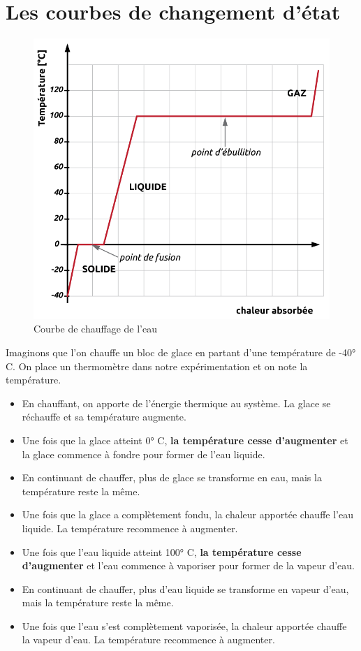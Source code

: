 \documentclass[
  11pt,
  french,
  a4paper,
  openany]{book}
\providecommand{\tightlist}{%
  \setlength{\itemsep}{0pt}\setlength{\parskip}{0pt}}
\begin{document}
\hypertarget{les-courbes-de-changement-duxe9tat}{%
\section{Les courbes de changement d'état}\label{les-courbes-de-changement-duxe9tat}}

\begin{figure}

{\centering \includegraphics[width=0.4\linewidth]{images/courbe-chgt-etat} 

}

\caption{Courbe de chauffage de l'eau}\label{fig:courbe-chgt-etat}
\end{figure}

Imaginons que l'on chauffe un bloc de glace en partant d'une température de -40° C. On place un thermomètre dans notre expérimentation et on note la température.

\begin{itemize}
\tightlist
\item
  En chauffant, on apporte de l'énergie thermique au système. La glace se réchauffe et sa température augmente.
\item
  Une fois que la glace atteint 0° C, \textbf{la température cesse d'augmenter} et la glace commence à fondre pour former de l'eau liquide.
\item
  En continuant de chauffer, plus de glace se transforme en eau, mais la température reste la même.
\item
  Une fois que la glace a complètement fondu, la chaleur apportée chauffe l'eau liquide.
  La température recommence à augmenter.
\item
  Une fois que l'eau liquide atteint 100° C, \textbf{la température cesse d'augmenter} et l'eau commence à vaporiser pour former de la vapeur d'eau.
\item
  En continuant de chauffer, plus d'eau liquide se transforme en vapeur d'eau, mais la température reste la même.
\item
  Une fois que l'eau s'est complètement vaporisée, la chaleur apportée chauffe la vapeur d'eau.
  La température recommence à augmenter.
\end{itemize}
\end{document}
